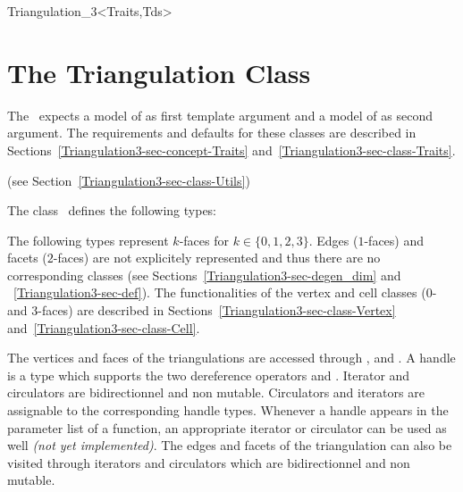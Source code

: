 \begin{ccClassTemplate}{Triangulation_3<Traits,Tds>}
\section{The Triangulation Class \protect{} }

\ccDefinition

The \ccClassTemplateName\ expects a model of  as first template argument and a model of  as second argument. The requirements and defaults for these
classes are described in Sections~\ref{Triangulation3-sec-concept-Traits} 
and~\ref{Triangulation3-sec-class-Traits}.


(see Section~\ref{Triangulation3-sec-class-Utils})

\ccTypes
The class \ccClassTemplateName\ defines the following types:
\ccThreeToTwo

\ccGlue
{}
\ccGlue
{}
\ccGlue
{}

The following types represent $k$-faces for $k\in\{0,1,2,3\}$. Edges
($1$-faces) and facets ($2$-faces) are not explicitely represented and
thus there are no corresponding classes (see
Sections~\ref{Triangulation3-sec-degen_dim} and
~\ref{Triangulation3-sec-def}). The functionalities of the 
vertex and cell classes ($0$- and $3$-faces) are described in
Sections~\ref{Triangulation3-sec-class-Vertex}
and~\ref{Triangulation3-sec-class-Cell}.

\ccGlue
{}

\ccGlue
{}

The vertices and faces of the triangulations are accessed through
,  and . 
A handle is a type which supports the two dereference operators
 and . Iterator and circulators are
bidirectionnel and non mutable.  Circulators and iterators are
assignable to the corresponding handle types. Whenever a handle appears 
in the parameter list of a function, an appropriate iterator or
circulator can be used as well \textit{(not yet implemented)}.  The
edges and facets of the 
triangulation can also be visited through iterators and circulators
which are bidirectionnel and non mutable.


\end{ccClassTemplate}
